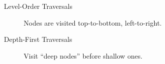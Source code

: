 
\begin{description}
\item[Level-Order Traversals] Nodes are visited top-to-bottom, left-to-right.
\item[Depth-First Traversals] Visit ``deep nodes'' before shallow ones.
\end{description}
